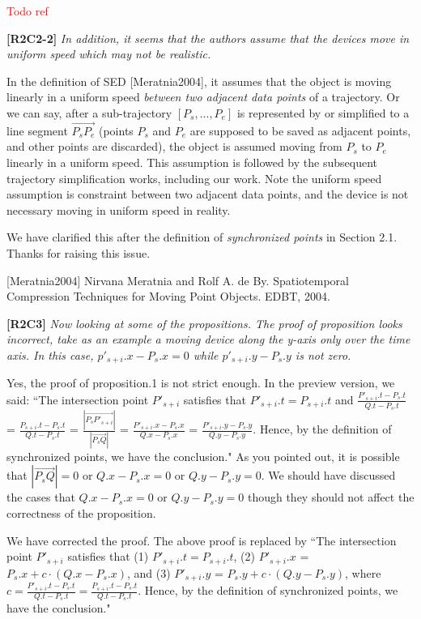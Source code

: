 \documentclass{letter}
\begin{document}
\textcolor{red}{Todo ref}

\textbf{[R2C2-2]} \emph{In addition, it seems that the authors assume that the devices move in uniform speed which may not be realistic.}

In the definition of SED [Meratnia2004], it assumes that the object is moving linearly in a uniform speed \textit{between two adjacent data points} of a trajectory. Or we can say, after a sub-trajectory $[P_s, ..., P_e]$ is represented by or simplified to a line segment $\overrightarrow{P_sP_e}$ (points $P_s$ and $P_e$ are supposed to be saved as adjacent points, and other points are discarded), the object is assumed moving from $P_s$ to $P_e$ linearly in a uniform speed. This assumption is followed by the subsequent trajectory simplification works, including our work. Note the uniform speed assumption is constraint between two adjacent data points, and the device is not necessary moving in uniform speed in reality.

We have clarified this after the definition of \emph{synchronized points} in Section 2.1. Thanks for raising this issue.

[Meratnia2004] Nirvana Meratnia and Rolf A. de By. Spatiotemporal Compression Techniques for Moving Point Objects. EDBT, 2004.


\textbf{[R2C3]} \emph{Now looking at some of the propositions.
The proof of proposition looks incorrect, take as an example a moving device along the y-axis only over the time axis. In this case, $p'_{s+i}.x - P_s.x = 0$ while $p'_{s+i}.y - P_s.y$ is not zero.
}

Yes, the proof of proposition.1 is not strict enough. In the preview version, we said:
``The intersection point $P'_{s+i}$ satisfies that $P'_{s+i}.t = P_{s+i}.t$ and
$\frac{P'_{s+i}.t - P_{s}.t}{Q.t - P_{s}.t}$ = $\frac{P_{s+i}.t - P_{s}.t}{Q.t - P_{s}.t}$  =
$\frac{|\overrightarrow{P_sP'_{s+i}}|}{|\overrightarrow{P_sQ}|}$ =
$\frac{P'_{s+i}.x - P_{s}.x}{Q.x - P_{s}.x}$ =
$\frac{P'_{s+i}.y - P_{s}.y}{Q.y - P_{s}.y}$.
Hence, by the definition of synchronized points, we have the conclusion."
As you pointed out, it is possible that $|\overrightarrow{P_sQ}|=0$ or $Q.x - P_{s}.x=0$ or $Q.y - P_{s}.y=0$. We should have discussed the cases that $Q.x - P_{s}.x=0$ or $Q.y - P_{s}.y=0$ though they should not affect the correctness of the proposition.

We have corrected the proof. The above proof is replaced by
``The intersection point $P'_{s+i}$ satisfies that
(1) $P'_{s+i}.t = P_{s+i}.t$,
(2) $P'_{s+i}.x$ = $P_s.x +  c\cdot(Q.x - P_s.x)$, and
(3) $P'_{s+i}.y$ = $P_s.y +  c\cdot(Q.y - P_s.y)$,
where $c= \frac{P'_{s+i}.t - P_{s}.t}{Q.t - P_{s}.t}= \frac{P_{s+i}.t-P_s.t}{Q.t-P_s.t}$.
Hence, by the definition of synchronized points, we have the conclusion."
\end{document}

